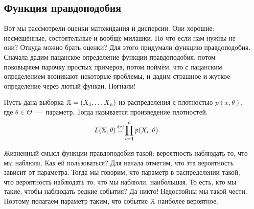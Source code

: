 \documentclass[../TV&MS.tex]{subfiles}
\begin{document}
\subsection{Функция правдоподобия}

Вот мы рассмотрели оценки матожидания и дисперсии.
Они хорошие: несмещённые, состоятельные и вообще милашки.
Но что если нам нужны не они? Откуда можно брать оценки?
Для этого придумали функцию правдоподобия. 
Сначала дадим пацанское определение функции правдоподобия,
потом поковыряем парочку простых примеров, потом поймём, 
что с пацанским определением возникают некоторые проблемы,
и дадим страшное и жуткое определение через лютый функан.
Погнали!

\begin{Def}\label{ms:l:def:likelihood}
    Пусть дана выборка $\mathbb{X} = (X_1,\ldots X_n)$ из распределения с
    плотностью $p(x, \theta)$, где $\theta \in \Theta$~---~параметр.
    Тогда  называется произведение плотностей.
    $$
        L(\Smpl, \theta) \myeq \prod\limits_{i=1}^{n} p(X_i, \theta).
    $$
\end{Def} 

\begin{Wtf}
    Жизненный смысл функции правдоподобия такой: вероятность наблюдать то,
    что мы наблюли. Как ей пользоваться?
    Для начала отметим, что эта вероятность зависит от параметра.
    Тогда мы говорим, что параметр в распределении такой,
    что вероятность наблюдать то, что мы наблюли, наибольшая.
    То есть, кто мы такие, чтобы наблюдать редкие события?
    Да никто! Недостойны мы такой чести.
    Поэтому полагаем параметр таким, что событие $\mathbb{X}$ наиболее вероятное.
\end{Wtf} 
\end{document}
